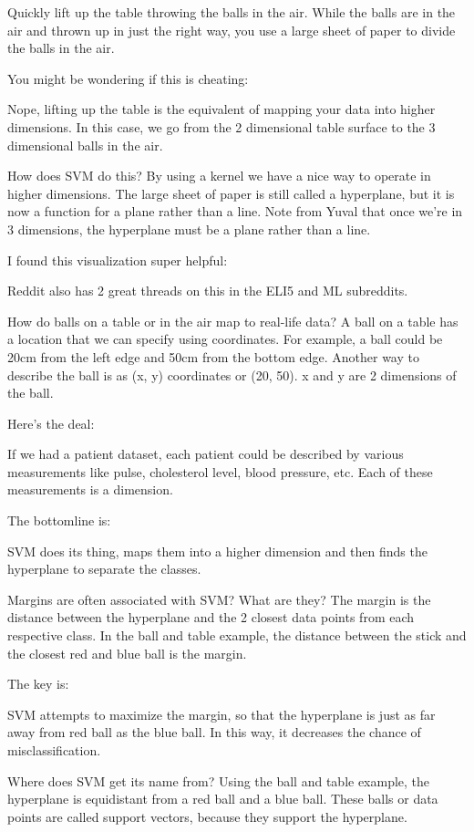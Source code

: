 Quickly lift up the table throwing the balls in the air. While the balls are in the air and thrown up in just the right way, you use a large sheet of paper to divide the balls in the air.

You might be wondering if this is cheating:

Nope, lifting up the table is the equivalent of mapping your data into higher dimensions. In this case, we go from the 2 dimensional table surface to the 3 dimensional balls in the air.

How does SVM do this? By using a kernel we have a nice way to operate in higher dimensions. The large sheet of paper is still called a hyperplane, but it is now a function for a plane rather than a line. Note from Yuval that once we’re in 3 dimensions, the hyperplane must be a plane rather than a line.

I found this visualization super helpful:



Reddit also has 2 great threads on this in the ELI5 and ML subreddits.

How do balls on a table or in the air map to real-life data? A ball on a table has a location that we can specify using coordinates. For example, a ball could be 20cm from the left edge and 50cm from the bottom edge. Another way to describe the ball is as (x, y) coordinates or (20, 50). x and y are 2 dimensions of the ball.

Here’s the deal:

If we had a patient dataset, each patient could be described by various measurements like pulse, cholesterol level, blood pressure, etc. Each of these measurements is a dimension.

The bottomline is:

SVM does its thing, maps them into a higher dimension and then finds the hyperplane to separate the classes.

Margins are often associated with SVM? What are they? The margin is the distance between the hyperplane and the 2 closest data points from each respective class. In the ball and table example, the distance between the stick and the closest red and blue ball is the margin.

The key is:

SVM attempts to maximize the margin, so that the hyperplane is just as far away from red ball as the blue ball. In this way, it decreases the chance of misclassification.

Where does SVM get its name from? Using the ball and table example, the hyperplane is equidistant from a red ball and a blue ball. These balls or data points are called support vectors, because they support the hyperplane.


